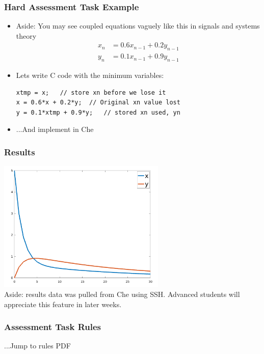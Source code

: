 \documentclass[14pt]{beamer}
\begin{document}
\begin{frame}[fragile]
\frametitle{Hard Assessment Task Example}
\begin{itemize}
\item Aside: You may see coupled equations vaguely like this in signals and systems theory
\begin{align*}
x_n &= 0.6x_{n-1} + 0.2y_{n-1}\\
y_n &= 0.1x_{n-1} + 0.9y_{n-1}
\end{align*}

\item Lets write C code with the minimum variables:
\begin{lstlisting}[style=pseudo]
xtmp = x;	// store xn before we lose it
x = 0.6*x + 0.2*y;	// Original xn value lost
y = 0.1*xtmp + 0.9*y;	// stored xn used, yn
\end{lstlisting}
\item ...And implement in Che
\end{itemize}
\end{frame}

\begin{frame}
\frametitle{Results}
\begin{center}
\includegraphics[width=0.6\textwidth]{coupled}\\
{\small Aside: results data was pulled from Che using SSH. Advanced students will appreciate this feature in later weeks.}
\end{center}
\end{frame}

\begin{frame}
\frametitle{Assessment Task Rules}
\begin{center}
...Jump to rules PDF
\end{center}
\end{frame}
\end{document}
